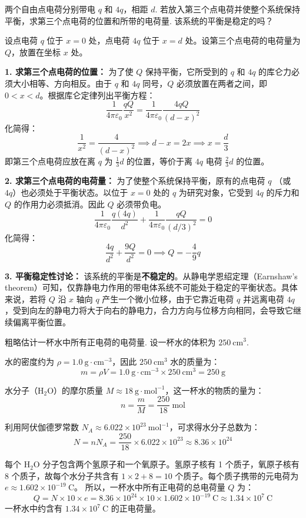 \begin{exercise}\label{ex:15.1}
两个自由点电荷分别带电 $q$ 和 $4q$，相距 $d$. 若放入第三个点电荷并使整个系统保持平衡，求第三个点电荷的位置和所带的电荷量. 该系统的平衡是稳定的吗？
\end{exercise}
\begin{solution}
设点电荷 $q$ 位于 $x = 0$ 处，点电荷 $4q$ 位于 $x = d$ 处。设第三个点电荷的电荷量为 $Q$，放置在坐标 $x$ 处。

\textbf{1. 求第三个点电荷的位置：}
为了使 $Q$ 保持平衡，它所受到的 $q$ 和 $4q$ 的库仑力必须大小相等、方向相反。由于 $q$ 和 $4q$ 同号，$Q$ 必须放置在两者之间，即 $0 < x < d$。根据库仑定律列出平衡方程：
$$ \frac{1}{4\pi\varepsilon_0} \frac{qQ}{x^2} = \frac{1}{4\pi\varepsilon_0} \frac{4qQ}{(d - x)^2} $$
化简得：
$$ \frac{1}{x^2} = \frac{4}{(d - x)^2} \implies d - x = 2x \implies x = \frac{d}{3} $$
即第三个点电荷应放在离 $q$ 为 $\frac{1}{3}d$ 的位置，等价于离 $4q$ 电荷 $\frac{2}{3}d$ 的位置。

\textbf{2. 求第三个点电荷的电荷量：}
为了使整个系统保持平衡，原有的点电荷 $q$ （或 $4q$）也必须处于平衡状态。以位于 $x = 0$ 处的 $q$ 为研究对象，它受到 $4q$ 的斥力和 $Q$ 的作用力必须抵消。因此 $Q$ 必须带负电。
$$ \frac{1}{4\pi\varepsilon_0} \frac{q(4q)}{d^2} + \frac{1}{4\pi\varepsilon_0} \frac{qQ}{(d/3)^2} = 0 $$
化简得：
$$ \frac{4q}{d^2} + \frac{9Q}{d^2} = 0 \implies Q = -\frac{4}{9}q $$

\textbf{3. 平衡稳定性讨论：}
该系统的平衡是\textbf{不稳定的}。从静电学恩绍定理（Earnshaw's theorem）可知，仅靠静电力作用的带电体系统不可能处于稳定的平衡状态。具体来说，若将 $Q$ 沿 $x$ 轴向 $q$ 产生一个微小位移，由于它靠近电荷 $q$ 并远离电荷 $4q$，受到向左的静电力将大于向右的静电力，合力方向与位移方向相同，会导致它继续偏离平衡位置。
\end{solution}

\begin{exercise}\label{ex:15.2}
粗略估计一杯水中所有正电荷的电荷量. 设一杯水的体积为 $250 \ \mathrm{cm^3}$.
\end{exercise}
\begin{solution}
水的密度约为 $\rho = 1.0 \ \mathrm{g \cdot cm^{-3}}$，因此 $250 \ \mathrm{cm^3}$ 水的质量为：
$$ m = \rho V = 1.0 \ \mathrm{g \cdot cm^{-3}} \times 250 \ \mathrm{cm^3} = 250 \ \mathrm{g} $$

水分子（$\mathrm{H_2O}$）的摩尔质量 $M \approx 18 \ \mathrm{g \cdot mol^{-1}}$，这一杯水的物质的量为：
$$ n = \frac{m}{M} = \frac{250}{18} \ \mathrm{mol} $$

利用阿伏伽德罗常数 $N_A \approx 6.022 \times 10^{23} \ \mathrm{mol^{-1}}$，可求得水分子总数为：
$$ N = n N_A = \frac{250}{18} \times 6.022 \times 10^{23} \approx 8.36 \times 10^{24} $$

每个 $\mathrm{H_2O}$ 分子包含两个氢原子和一个氧原子。氢原子核有 1 个质子，氧原子核有 8 个质子，故每个水分子共含有 $1 \times 2 + 8 = 10$ 个质子。每个质子携带的元电荷为 $e \approx 1.602 \times 10^{-19} \ \mathrm{C}$。
所以，一杯水中所有正电荷的总电荷量 $Q$ 为：
$$ Q = N \times 10 \times e = 8.36 \times 10^{24} \times 10 \times 1.602 \times 10^{-19} \ \mathrm{C} \approx 1.34 \times 10^7 \ \mathrm{C} $$
一杯水中约含有 $1.34 \times 10^7 \ \mathrm{C}$ 的正电荷量。
\end{solution}

